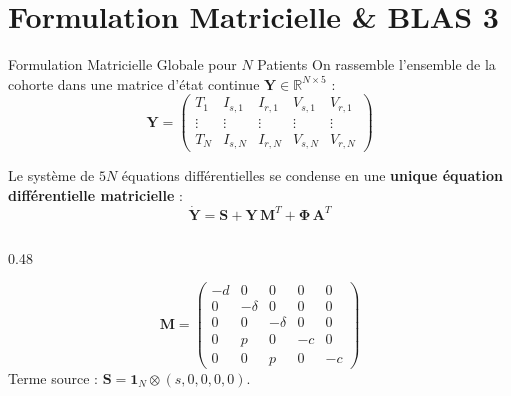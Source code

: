 \documentclass[aspectratio=169, 10pt, french]{beamer}
\begin{document}
\section{Formulation Matricielle \& BLAS 3}
\begin{frame}{Formulation Matricielle Globale pour $N$ Patients}
    On rassemble l'ensemble de la cohorte dans une matrice d'état continue $\mathbf{Y} \in \mathbb{R}^{N \times 5}$ :
    $$\mathbf{Y} = \begin{pmatrix} T_1 & I_{s,1} & I_{r,1} & V_{s,1} & V_{r,1} \\ \vdots & \vdots & \vdots & \vdots & \vdots \\ T_N & I_{s,N} & I_{r,N} & V_{s,N} & V_{r,N} \end{pmatrix}$$

    Le système de $5N$ équations différentielles se condense en une \textbf{unique équation différentielle matricielle} :
    \begin{equation*}
        \mathbf{\dot{Y}} = \mathbf{S} + \mathbf{Y}\,\mathbf{M}^T + \mathbf{\Phi}\,\mathbf{A}^T
    \end{equation*}

    \begin{columns}[t]
        \begin{column}{0.48\textwidth}
            \begin{cadrehpc}
                \footnotesize
                $$\mathbf{M} = \begin{pmatrix}
                -d & 0 & 0 & 0 & 0 \\
                0 & -\delta & 0 & 0 & 0 \\
                0 & 0 & -\delta & 0 & 0 \\
                0 & p & 0 & -c & 0 \\
                0 & 0 & p & 0 & -c
                \end{pmatrix}$$
                Terme source : $\mathbf{S} = \mathbf{1}_N \otimes (s, 0, 0, 0, 0)$.
            \end{cadrehpc}
        \end{column}


\end{columns}
\end{frame}
\end{document}
